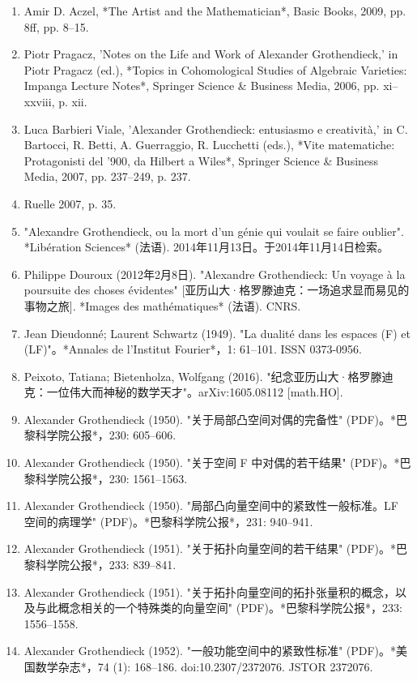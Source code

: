 \begin{enumerate}
\item Amir D. Aczel, *The Artist and the Mathematician*, Basic Books, 2009, pp. 8ff, pp. 8–15.  
\item Piotr Pragacz, 'Notes on the Life and Work of Alexander Grothendieck,' in Piotr Pragacz (ed.), *Topics in Cohomological Studies of Algebraic Varieties: Impanga Lecture Notes*, Springer Science & Business Media, 2006, pp. xi–xxviii, p. xii.  
\item Luca Barbieri Viale, 'Alexander Grothendieck: entusiasmo e creatività,' in C. Bartocci, R. Betti, A. Guerraggio, R. Lucchetti (eds.), *Vite matematiche: Protagonisti del '900, da Hilbert a Wiles*, Springer Science & Business Media, 2007, pp. 237–249, p. 237.  
\item Ruelle 2007, p. 35.  
\item "Alexandre Grothendieck, ou la mort d'un génie qui voulait se faire oublier". *Libération Sciences* (法语). 2014年11月13日。于2014年11月14日检索。  
\item Philippe Douroux (2012年2月8日). "Alexandre Grothendieck: Un voyage à la poursuite des choses évidentes" [亚历山大·格罗滕迪克：一场追求显而易见的事物之旅]. *Images des mathématiques* (法语). CNRS.
\item Jean Dieudonné; Laurent Schwartz (1949). "La dualité dans les espaces (F) et (LF)"。*Annales de l'Institut Fourier*，1: 61–101. ISSN 0373-0956.  
\item Peixoto, Tatiana; Bietenholza, Wolfgang (2016). "纪念亚历山大·格罗滕迪克：一位伟大而神秘的数学天才"。arXiv:1605.08112 [math.HO].  
\item Alexander Grothendieck (1950). "关于局部凸空间对偶的完备性" (PDF)。*巴黎科学院公报*，230: 605–606.  
\item Alexander Grothendieck (1950). "关于空间 F 中对偶的若干结果" (PDF)。*巴黎科学院公报*，230: 1561–1563.  
\item Alexander Grothendieck (1950). "局部凸向量空间中的紧致性一般标准。LF 空间的病理学" (PDF)。*巴黎科学院公报*，231: 940–941.  
\item Alexander Grothendieck (1951). "关于拓扑向量空间的若干结果" (PDF)。*巴黎科学院公报*，233: 839–841.  
\item Alexander Grothendieck (1951). "关于拓扑向量空间的拓扑张量积的概念，以及与此概念相关的一个特殊类的向量空间" (PDF)。*巴黎科学院公报*，233: 1556–1558.  
\item Alexander Grothendieck (1952). "一般功能空间中的紧致性标准" (PDF)。*美国数学杂志*，74 (1): 168–186. doi:10.2307/2372076. JSTOR 2372076.

\end{enumerate}

